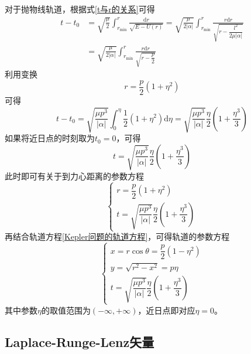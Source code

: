 对于抛物线轨道，根据式\eqref{t与r的关系}可得
\begin{align*}
	t-t_0 & = \sqrt{\frac{\mu}{2}} \int_{r_{\min}}^r \frac{\mathrm{d}r}{\sqrt{E-U(r)}} = \sqrt{\frac{\mu}{2|\alpha|}} \int_{r_{\min}}^r \frac{r\mathrm{d}r}{\sqrt{r-\dfrac{l^2}{2\mu |\alpha|}}} \\
	& = \sqrt{\frac{\mu}{2|\alpha|}} \int_{r_{\min}}^r \frac{r\mathrm{d}r}{\sqrt{r-\dfrac{p}{2}}}
\end{align*}
利用变换
\begin{equation*}
	r = \frac{p}{2}(1+\eta^2)
\end{equation*}
可得
\begin{equation*}
	t-t_0 = \sqrt{\frac{\mu p^3}{|\alpha|}} \int_0^\eta \frac12(1+\eta^2) \mathrm{d}\eta = \sqrt{\frac{\mu p^3}{|\alpha|}} \frac{\eta}{2}\left(1+\frac{\eta^3}{3}\right)
\end{equation*}
如果将近日点的时刻取为$t_0=0$，可得
\begin{equation}
	t = \sqrt{\frac{\mu p^3}{|\alpha|}} \frac{\eta}{2}\left(1+\frac{\eta^3}{3}\right)
\end{equation}
此时即可有关于到力心距离的参数方程
\begin{equation}
\begin{cases}
	r = \dfrac{p}{2}(1+\eta^2) \\
	t = \sqrt{\dfrac{\mu p^3}{|\alpha|}} \dfrac{\eta}{2}\left(1+\dfrac{\eta^3}{3}\right)
\end{cases}
\end{equation}
再结合轨道方程\eqref{Kepler问题的轨道方程}，可得轨道的参数方程
\begin{equation}
\begin{cases}
	x = r\cos \theta = \dfrac{p}{2}(1-\eta^2) \\
	y = \sqrt{r^2-x^2} = p\eta \\
	t = \sqrt{\dfrac{\mu p^3}{|\alpha|}} \dfrac{\eta}{2}\left(1+\dfrac{\eta^3}{3}\right)
\end{cases}
\end{equation}
其中参数$\eta$的取值范围为$(-\infty,+\infty)$，近日点即对应$\eta=0$。

\subsection{Laplace-Runge-Lenz矢量}

